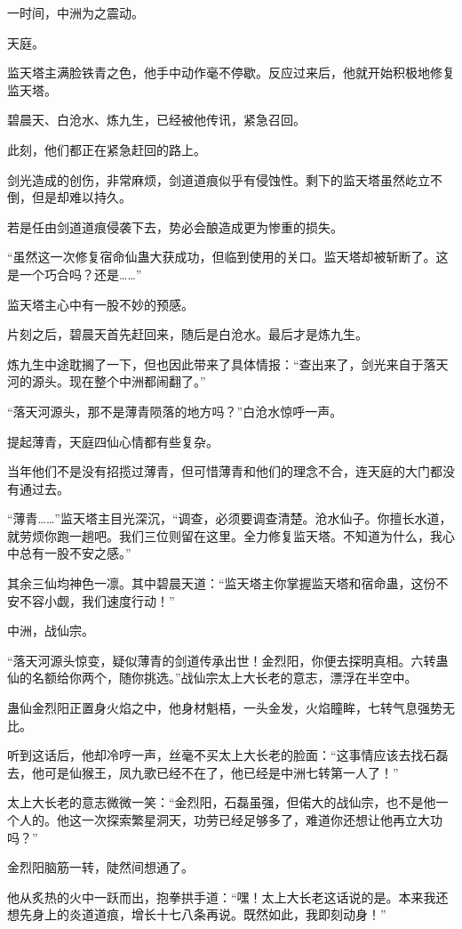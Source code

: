 \begin{this_body}
一时间，中洲为之震动。

天庭。

监天塔主满脸铁青之色，他手中动作毫不停歇。反应过来后，他就开始积极地修复监天塔。

碧晨天、白沧水、炼九生，已经被他传讯，紧急召回。

此刻，他们都正在紧急赶回的路上。

剑光造成的创伤，非常麻烦，剑道道痕似乎有侵蚀性。剩下的监天塔虽然屹立不倒，但是却难以持久。

若是任由剑道道痕侵袭下去，势必会酿造成更为惨重的损失。

“虽然这一次修复宿命仙蛊大获成功，但临到使用的关口。监天塔却被斩断了。这是一个巧合吗？还是……”

监天塔主心中有一股不妙的预感。

片刻之后，碧晨天首先赶回来，随后是白沧水。最后才是炼九生。

炼九生中途耽搁了一下，但也因此带来了具体情报：“查出来了，剑光来自于落天河的源头。现在整个中洲都闹翻了。”

“落天河源头，那不是薄青陨落的地方吗？”白沧水惊呼一声。

提起薄青，天庭四仙心情都有些复杂。

当年他们不是没有招揽过薄青，但可惜薄青和他们的理念不合，连天庭的大门都没有通过去。

“薄青……”监天塔主目光深沉，“调查，必须要调查清楚。沧水仙子。你擅长水道，就劳烦你跑一趟吧。我们三位则留在这里。全力修复监天塔。不知道为什么，我心中总有一股不安之感。”

其余三仙均神色一凛。其中碧晨天道：“监天塔主你掌握监天塔和宿命蛊，这份不安不容小觑，我们速度行动！”

中洲，战仙宗。

“落天河源头惊变，疑似薄青的剑道传承出世！金烈阳，你便去探明真相。六转蛊仙的名额给你两个，随你挑选。”战仙宗太上大长老的意志，漂浮在半空中。

蛊仙金烈阳正置身火焰之中，他身材魁梧，一头金发，火焰瞳眸，七转气息强势无比。

听到这话后，他却冷哼一声，丝毫不买太上大长老的脸面：“这事情应该去找石磊去，他可是仙猴王，凤九歌已经不在了，他已经是中洲七转第一人了！”

太上大长老的意志微微一笑：“金烈阳，石磊虽强，但偌大的战仙宗，也不是他一个人的。他这一次探索繁星洞天，功劳已经足够多了，难道你还想让他再立大功吗？”

金烈阳脑筋一转，陡然间想通了。

他从炙热的火中一跃而出，抱拳拱手道：“嘿！太上大长老这话说的是。本来我还想先身上的炎道道痕，增长十七八条再说。既然如此，我即刻动身！”


\end{this_body}
